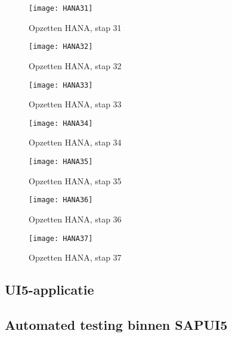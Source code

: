             \begin{figure}	
                \centering
                \texttt{[image: HANA31]}
                \caption{Opzetten HANA, stap 31} \label{HANA31}
            \end{figure}
            
            \begin{figure}	
                \centering
                \texttt{[image: HANA32]}
                \caption{Opzetten HANA, stap 32} \label{HANA32}
            \end{figure}
            
            \begin{figure}	
                \centering
                \texttt{[image: HANA33]}
                \caption{Opzetten HANA, stap 33} \label{HANA33}
            \end{figure} 
        
            \begin{figure}	
                \centering
                \texttt{[image: HANA34]}
                \caption{Opzetten HANA, stap 34} \label{HANA34}
            \end{figure}
            
            \begin{figure}	
                \centering
                \texttt{[image: HANA35]}
                \caption{Opzetten HANA, stap 35} \label{HANA35}
            \end{figure}
            
            \begin{figure}	
                \centering
                \texttt{[image: HANA36]}
                \caption{Opzetten HANA, stap 36} \label{HANA36}
            \end{figure}
            
            \begin{figure}	
                \centering
                \texttt{[image: HANA37]}
                \caption{Opzetten HANA, stap 37} \label{HANA37}
            \end{figure} 
            
        \subsection{UI5-applicatie}
        
        
        \subsection{Automated testing binnen SAPUI5}

